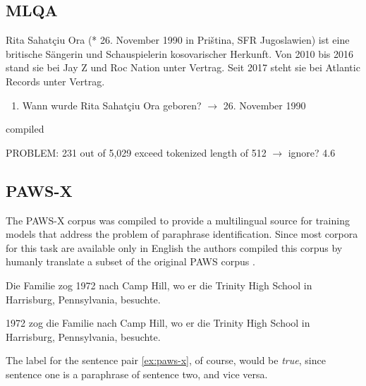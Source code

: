 
\subsection{MLQA}

\begin{examples}
	\label{ex:mlqa}
	\item Rita Sahatçiu Ora (* 26. November 1990 in Priština, SFR Jugoslawien) ist eine britische Sängerin und Schauspielerin kosovarischer Herkunft. Von 2010 bis 2016 stand sie bei Jay Z und Roc Nation unter Vertrag. Seit 2017 steht sie bei Atlantic Records unter Vertrag.
\end{examples}

\begin{enumerate}
	\item Wann wurde Rita Sahatçiu Ora geboren? $\rightarrow$ 26. November 1990
\end{enumerate}

\cite{lewis2019mlqa} compiled

PROBLEM: 231 out of 5,029 exceed tokenized length of 512 $\rightarrow$ ignore? 4.6%

\subsection{PAWS-X}

The PAWS-X corpus \cite{yang2019paws} was compiled to provide a multilingual source for training models that address the problem of paraphrase identification. 
Since most corpora for this task are available only in English the authors compiled this corpus by humanly translate a subset of the original PAWS corpus \cite{zhang2019paws}.

\begin{examples}
	\label{ex:paws-x}
	\item Die Familie zog 1972 nach Camp Hill, wo er die Trinity High School in Harrisburg, Pennsylvania, besuchte.
		
	1972 zog die Familie nach Camp Hill, wo er die Trinity High School in Harrisburg, Pennsylvania, besuchte.
\end{examples}

The label for the sentence pair \ref{ex:paws-x}, of course, would be \emph{true}, since sentence one is a paraphrase of sentence two, and vice versa.


